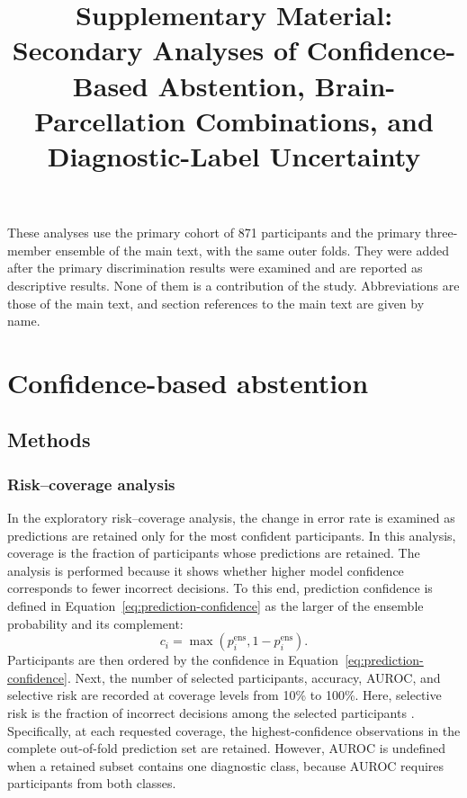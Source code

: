 \documentclass[a4paper,fleqn]{cas-sc}
\begin{document}
\let\WriteBookmarks\relax
\def\floatpagepagefraction{1}
\def\textpagefraction{.001}


\title[mode=title]{Supplementary Material: Secondary Analyses of Confidence-Based Abstention, Brain-Parcellation Combinations, and Diagnostic-Label Uncertainty}


\noindent These analyses use the primary cohort of 871 participants and the primary three-member ensemble of the main text, with the same outer folds. They were added after the primary discrimination results were examined and are reported as descriptive results. None of them is a contribution of the study. Abbreviations are those of the main text, and section references to the main text are given by name.

\section{Confidence-based abstention}
\label{sec:supp-abstention}

\subsection{Methods}

\subsubsection*{Risk--coverage analysis}
In the exploratory risk--coverage analysis, the change in error rate is examined as predictions are retained only for the most confident participants. In this analysis, coverage is the fraction of participants whose predictions are retained. The analysis is performed because it shows whether higher model confidence corresponds to fewer incorrect decisions. To this end, prediction confidence is defined in Equation~\eqref{eq:prediction-confidence} as the larger of the ensemble probability and its complement:
\begin{equation}
c_i
=
\max\left(p_i^{\mathrm{ens}},1-p_i^{\mathrm{ens}}\right).
\label{eq:prediction-confidence}
\end{equation}
Participants are then ordered by the confidence in Equation~\eqref{eq:prediction-confidence}. Next, the number of selected participants, accuracy, AUROC, and selective risk are recorded at coverage levels from 10\% to 100\%. Here, selective risk is the fraction of incorrect decisions among the selected participants \citep{GeifmanElYaniv2017}. Specifically, at each requested coverage, the highest-confidence observations in the complete out-of-fold prediction set are retained. However, AUROC is undefined when a retained subset contains one diagnostic class, because AUROC requires participants from both classes.
\end{document}
